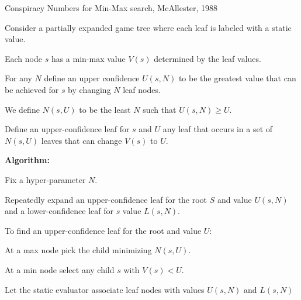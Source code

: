 {Conspiracy Numbers for Min-Max search, McAllester, 1988

\vfill
Consider a partially expanded game tree where each leaf is labeled with a static value.

\vfill
Each node $s$ has a min-max value $V(s)$ determined by the leaf values.

\vfill
For any $N$ define an upper confidence $U(s,N)$ to be the greatest value that can be achieved for $s$ by changing $N$ leaf nodes.

\vfill
We define $N(s,U)$ to be the least $N$ such that $U(s,N) \geq U$.


\vfill
Define an upper-confidence leaf for $s$ and $U$ any leaf that occurs in a set of $N(s,U)$ leaves that can change $V(s)$ to $U$.

\vfill
{\bf Algorithm:}

\vfill
Fix a hyper-parameter $N$.

\vfill
Repeatedly expand an upper-confidence leaf for the root $S$ and value $U(s,N)$
and a lower-confidence leaf for $s$ value $L(s,N)$.


To find an upper-confidence leaf for the root and value $U$:

\vfill
At a max node pick the child minimizing $N(s,U)$.

\vfill
At a min node select any child $s$ with $V(s) < U$.

\vfill
{}

Let the static evaluator associate leaf nodes with values $U(s,N)$ and $L(s,N)$


}



